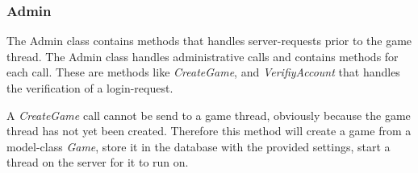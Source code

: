 \subsubsection{Admin}\label{subsec:admindesign}
The Admin class contains methods that handles server-requests prior to the game thread. The Admin class handles administrative calls and contains methods for each call. These are methods like \textit{CreateGame}, and \textit{VerifiyAccount} that handles the verification of a login-request. 

A \textit{CreateGame} call cannot be send to a game thread, obviously because the game thread has not yet been created. Therefore this method will create a game from a model-class \textit{Game}, store it in the database with the provided settings, start a thread on the server for it to run on. 

